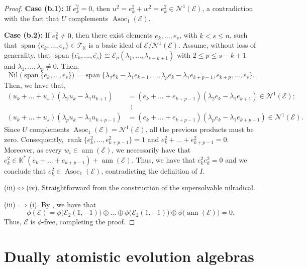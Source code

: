 \documentclass[12pt,reqno]{amsart}
\theoremstyle{definition}
\theoremstyle{remark}
\DeclareMathOperator{\ann}{ann}
\DeclareMathOperator{\spa}{span}
\DeclareMathOperator{\rank}{rank}
\DeclareMathOperator{\asoc}{Asoc}
\DeclareMathOperator{\nil}{Nil}
\numberwithin{equation}{section}
\begin{document}
\begin{proof}
{\bf Case (b.1):} If $\overline{e_k^2}=0$, then $u^2=e_k^2+w^2=e_k^2\in\mathcal{N}^1(\mathcal{E})$, a contradiction with the fact that $U$ complements $\asoc_1(\mathcal{E})$.

{\bf Case (b.2):} If $\overline{e_k^2}\neq0$, then there exist elements $e_k,\dots,e_s$, with $k<s\leq n$, such that $\spa\{\overline{e_k},\dots,\overline{e_s}\}\in\mathcal{T}_\mathbb{K}$ is a basic ideal of $\mathcal{E}/\mathcal{N}^1(\mathcal{E})$. Assume, without loss of generality, that $\spa\{\overline{e_k},\dots,\overline{e_s}\}\cong\mathcal{E}_p(\lambda_1,\dots,\lambda_{s-k+1})$ with $2\leq p\leq s-k+1$ and $\lambda_1,\dots,\lambda_p\neq0$. Then,
\[\nil\big(\spa\{\overline{e_k},\dots,\overline{e_s}\}\big)=\spa\{\lambda_2\overline{e_k}-\lambda_1\overline{e_{k+1}},\dots,\lambda_p\overline{e_k}-\lambda_1\overline{e_{k+p-1}},\overline{e_{k+p}},\dots,\overline{e_s}\}.\]
Then, we have that,
\begin{align*}
	(u_k+\dots+u_s)(\lambda_2u_k-\lambda_1u_{k+1})&=(e_k+\dots+e_{k+p-1})(\lambda_2e_k-\lambda_1e_{k+1})\in\mathcal{N}^1(\mathcal{E});\\
	&\:\ \vdots \\
	(u_k+\dots+u_s)(\lambda_{p}u_k-\lambda_1u_{k+p-1})&=(e_k+\dots+e_{k+p-1})(\lambda_{p}e_k-\lambda_1e_{k+p-1})\in\mathcal{N}^1(\mathcal{E}).
\end{align*}
Since $U$ complements $\asoc_1(\mathcal{E})=\mathcal{N}^1(\mathcal{E})$, all the previous products must be zero. Consequently, $\rank\{e_k^2,\dots,e_{k+p-1}^2\}=1$ and $e_k^2+\dots+e_{k+p-1}^2=0$. Moreover, as every $w_i\in\ann(\mathcal{E})$, we necessarily have that $e_k^2\in\mathbb{K}^*(e_k+\dots+e_{k+p-1})+\ann(\mathcal{E})$. Thus, we have that $e_k^2e_k^2=0$ and we conclude that $e_k^2\in\asoc_1(\mathcal{E})$, contradicting the definition of $I$.

(iii)$\Longleftrightarrow$(iv). Straightforward from the construction of the supersolvable nilradical.

(iii)$\implies$(i). By \cite[Theorem 4.8]{frat_towers}, we have that %
$$\phi(\mathcal{E})=\phi\big(\mathcal{E}_2(1,-1)\big)\oplus\dots\oplus\phi\big(\mathcal{E}_2(1,-1)\big)\oplus\phi\big(\ann(\mathcal{E})\big)=0.$$Thus, $\mathcal{E}$ is $\phi$-free, completing the proof.
\end{proof}

\section{Dually atomistic evolution algebras}\label{sec:5}
\end{document}
